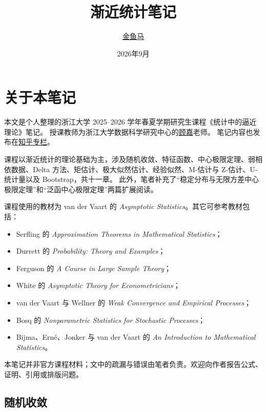 \documentclass[lang=cn,10pt,scheme=chinese,color=blue,usesamecnt]{asymptoticbook}
\title{渐近统计笔记}
\author{\href{https://www.zhihu.com/people/he-eeeeeeeee}{金鱼马}}
\date{2026年9月}
\institute{浙江大学}
\numberwithin{equation}{chapter}
\newcommand{\chapterreferences}{%
  \printbibliography[heading=subbibliography,title={本章参考文献}]%
}
\begin{document}
\maketitle
\frontmatter
\tableofcontents

\chapter*{关于本笔记}
{}
本文是个人整理的浙江大学 2025--2026 学年春夏学期研究生课程《统计中的逼近理论》笔记。
授课教师为浙江大学数据科学研究中心的\href{https://jia-gu.github.io/}{顾嘉}老师。
笔记内容也发布在\href{https://zhuanlan.zhihu.com/p/1973423321602348153}{知乎专栏}。

课程以渐近统计的理论基础为主，涉及随机收敛、特征函数、中心极限定理、弱相依数据、Delta 方法、矩估计、极大似然估计、经验似然、M-估计与 Z-估计、U-统计量以及 Bootstrap，共十一章。
此外，笔者补充了“稳定分布与无限方差中心极限定理”和“泛函中心极限定理”两篇扩展阅读。

课程使用的教材为 van der Vaart 的 \emph{Asymptotic Statistics}。其它可参考教材包括：
\begin{itemize}
\item Serfling 的 \emph{Approximation Theorems in Mathematical Statistics}；
\item Durrett 的 \emph{Probability: Theory and Examples}；
\item Ferguson 的 \emph{A Course in Large Sample Theory}；
\item White 的 \emph{Asymptotic Theory for Econometricians}；
\item van der Vaart 与 Wellner 的 \emph{Weak Convergence and Empirical Processes}；
\item Bosq 的 \emph{Nonparametric Statistics for Stochastic Processes}；
\item Bijma、Ern\'e、Jonker 与 van der Vaart 的 \emph{An Introduction to Mathematical Statistics}。
\end{itemize}

本笔记并非官方课程材料；文中的疏漏与错误由笔者负责。欢迎向作者报告公式、证明、引用或排版问题。

\mainmatter

\begin{refsection}
\chapter{随机收敛}\label{ch:random-convergence}

\nocite{vandervaart1998,serfling1980,durrett2019,ferguson1996,vandervaartwellner1996}
\chapterreferences
\end{refsection}
\end{document}
